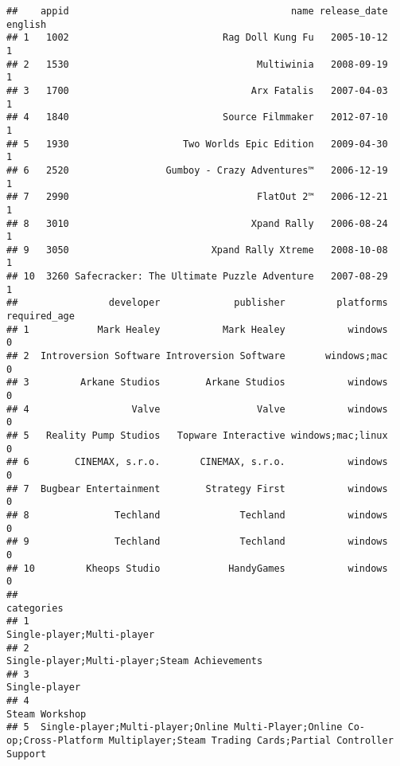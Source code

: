 \documentclass[
]{article}
\begin{document}
\begin{verbatim}
##    appid                                       name release_date english
## 1   1002                           Rag Doll Kung Fu   2005-10-12       1
## 2   1530                                 Multiwinia   2008-09-19       1
## 3   1700                                Arx Fatalis   2007-04-03       1
## 4   1840                           Source Filmmaker   2012-07-10       1
## 5   1930                    Two Worlds Epic Edition   2009-04-30       1
## 6   2520                 Gumboy - Crazy Adventures™   2006-12-19       1
## 7   2990                                 FlatOut 2™   2006-12-21       1
## 8   3010                                Xpand Rally   2006-08-24       1
## 9   3050                         Xpand Rally Xtreme   2008-10-08       1
## 10  3260 Safecracker: The Ultimate Puzzle Adventure   2007-08-29       1
##                developer             publisher         platforms required_age
## 1            Mark Healey           Mark Healey           windows            0
## 2  Introversion Software Introversion Software       windows;mac            0
## 3         Arkane Studios        Arkane Studios           windows            0
## 4                  Valve                 Valve           windows            0
## 5   Reality Pump Studios   Topware Interactive windows;mac;linux            0
## 6        CINEMAX, s.r.o.       CINEMAX, s.r.o.           windows            0
## 7  Bugbear Entertainment        Strategy First           windows            0
## 8               Techland              Techland           windows            0
## 9               Techland              Techland           windows            0
## 10         Kheops Studio            HandyGames           windows            0
##                                                                                                                               categories
## 1                                                                                                             Single-player;Multi-player
## 2                                                                                          Single-player;Multi-player;Steam Achievements
## 3                                                                                                                          Single-player
## 4                                                                                                                         Steam Workshop
## 5  Single-player;Multi-player;Online Multi-Player;Online Co-op;Cross-Platform Multiplayer;Steam Trading Cards;Partial Controller Support

\end{verbatim}
\end{document}

